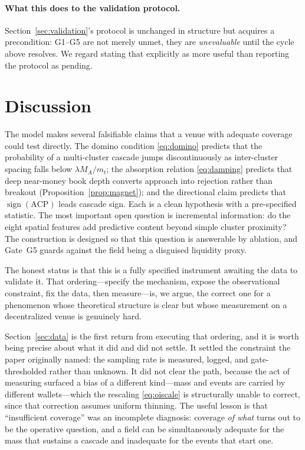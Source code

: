 \documentclass[11pt,a4paper]{article}
\theoremstyle{definition}
\theoremstyle{plain}
\newcommand{\sgn}{\operatorname{sign}}
\begin{document}
\paragraph{What this does to the validation protocol.} Section~\ref{sec:validation}'s protocol is
unchanged in structure but acquires a precondition: G1--G5 are not merely unmet, they are
\emph{unevaluable} until the cycle above resolves. We regard stating that explicitly as more useful
than reporting the protocol as pending.

\section{Discussion}
\label{sec:discussion}

The model makes several falsifiable claims that a venue with adequate coverage could test directly.
The domino condition \eqref{eq:domino} predicts that the probability of a multi-cluster cascade
jumps discontinuously as inter-cluster spacing falls below $\lambda M_A/m_t$; the absorption
relation \eqref{eq:damping} predicts that deep near-money book depth converts approach into
rejection rather than breakout (Proposition~\ref{prop:magnet}); and the directional claim predicts
that $\sgn(\mathrm{ACP})$ leads cascade sign. Each is a clean hypothesis with a pre-specified
statistic. The most important open question is incremental information: do the eight spatial
features add predictive content beyond simple cluster proximity? The construction is designed so
that this question is answerable by ablation, and Gate~G5 guards against the field being a disguised
liquidity proxy.

The honest status is that this is a fully specified instrument awaiting the data to validate it.
That ordering---specify the mechanism, expose the observational constraint, fix the data, then
measure---is, we argue, the correct one for a phenomenon whose theoretical structure is clear but
whose measurement on a decentralized venue is genuinely hard.

Section~\ref{sec:data} is the first return from executing that ordering, and it is worth being
precise about what it did and did not settle. It settled the constraint the paper originally
named: the sampling rate is measured, logged, and gate-thresholded rather than unknown. It did not
clear the path, because the act of measuring surfaced a bias of a different kind---mass and events
are carried by different wallets---which the rescaling \eqref{eq:oiscale} is structurally unable to
correct, since that correction assumes uniform thinning. The useful lesson is that
``insufficient coverage'' was an incomplete diagnosis: coverage \emph{of what} turns out to be the
operative question, and a field can be simultaneously adequate for the mass that sustains a cascade
and inadequate for the events that start one.
\end{document}

